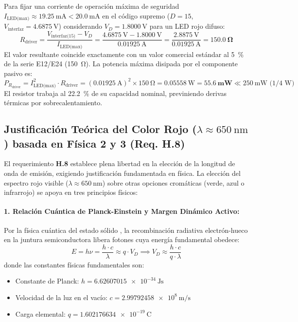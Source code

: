 \documentclass[11pt,letterpaper]{article}
\begin{document}
Para fijar una corriente de operación máxima de seguridad $I_{\text{LED(max)}} \approx \SI{19.25}{\milli\ampere} < \SI{20.0}{\milli\ampere}$ en el código supremo ($D = 15$, $V_{\text{interfaz}} = \SI{4.6875}{\volt}$) considerando $V_D = \SI{1.8000}{\volt}$ para un LED rojo difuso:
\begin{equation}
R_{\text{driver}} = \frac{V_{\text{interfaz(15)}} - V_D}{I_{\text{LED(max)}}} = \frac{\SI{4.6875}{\volt} - \SI{1.8000}{\volt}}{\SI{0.01925}{\ampere}} = \frac{\SI{2.8875}{\volt}}{\SI{0.01925}{\ampere}} = \mathbf{\SI{150.0}{\ohm}}
\label{eq:rdriver_calculo}
\end{equation}
El valor resultante coincide exactamente con un valor comercial estándar al \SI{5}{\percent} de la serie E12/E24 (\SI{150}{\ohm}). La potencia máxima disipada por el componente pasivo es:
\begin{equation}
P_{R_{\text{driver}}} = I_{\text{LED(max)}}^2 \cdot R_{\text{driver}} = (\SI{0.01925}{\ampere})^2 \times \SI{150}{\ohm} = \SI{0.05558}{\watt} = \mathbf{\SI{55.6}{\milli\watt}} \ll \SI{250}{\milli\watt}\text{ (1/4 W)}
\label{eq:potencia_rdriver}
\end{equation}
El resistor trabaja al \SI{22.2}{\percent} de su capacidad nominal, previniendo derivas térmicas por sobrecalentamiento.

\subsection{Justificación Teórica del Color Rojo ($\lambda \approx \SI{650}{\nano\meter}$) basada en Física 2 y 3 (Req. H.8)}
El requerimiento \textbf{H.8} establece plena libertad en la elección de la longitud de onda de emisión, exigiendo justificación fundamentada en física. La elección del espectro rojo visible ($\lambda \approx \SI{650}{\nano\meter}$) sobre otras opciones cromáticas (verde, azul o infrarrojo) se apoya en tres principios físicos:

\paragraph{1. Relación Cuántica de Planck-Einstein y Margen Dinámico Activo:}
Por la física cuántica del estado sólido \cite{tipler2010,kasap2013}, la recombinación radiativa electrón-hueco en la juntura semiconductora libera fotones cuya energía fundamental obedece:
\begin{equation}
E = h\nu = \frac{h \cdot c}{\lambda} \approx q \cdot V_D \implies V_D \approx \frac{h \cdot c}{q \cdot \lambda}
\label{eq:planck_einstein}
\end{equation}
donde las constantes físicas fundamentales son:
\begin{itemize}
    \item Constante de Planck: $h = \SI{6.62607015e-34}{\joule\second}$
    \item Velocidad de la luz en el vacío: $c = \SI{2.99792458e8}{\meter\per\second}$
    \item Carga elemental: $q = \SI{1.602176634e-19}{\coulomb}$
\end{itemize}
\end{document}
